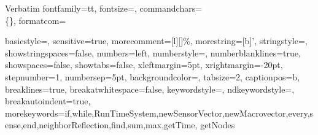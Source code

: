 %
  {Verbatim}%
  {fontfamily=tt,%
   fontsize=\small,%
   commandchars=\\\{\},%
   formatcom=\def\{{\symbol{123}}\def\}{\symbol{125}}\def\\{\symbol{92}}%
   }

\newcommand{\fancyfloatsize}{\small}


\newenvironment{fancyfigure}[1][tbp]%
  {\begin{figure}[#1]%
   \fancyfloatsize%
   \fancyfloatrule%
  }
  {\fancyfloatrule%
   \end{figure}}

\newcommand*{\Month}{%
  \ifcase\month \or
  January\or February\or March\or April\or May\or June\or
  July\or August\or September\or October\or November\or
  December\fi \xspace
}

\newcommand*{\Year}{\number\year\xspace}

\usepackage{calc}

\newenvironment{Ventry}[1]%
 {\begin{list}{}{\renewcommand{\makelabel}[1]{##1:\hfil}%
  \settowidth{\labelwidth}{\textsf{#1:}}%
  \setlength{\itemsep}{0pt}%
  \setlength{\parsep}{0pt}%
  \setlength{\leftmargin}{\labelwidth+\labelsep}}}%
  {\end{list}}

\def\PAIR#1#2{\langle#1, #2\rangle} 
{
  basicstyle=\ttfamily\small,
  sensitive=true,
  morecomment=[l][\color{red}\small]{\%},
  morestring=[b]',
  stringstyle=\color{dkgreen}, %
  showstringspaces=false,   
  numbers=left, %
  numberstyle=\ttfamily\small\color{gray}, %
  numberblanklines=true,
  showspaces=false,
  showtabs=false,
  xleftmargin=5pt,
  xrightmargin=-20pt,
  stepnumber=1,   
  numbersep=5pt,   
  backgroundcolor=\color{white},   
  tabsize=2,
  captionpos=b,   
  breaklines=true,
  breakatwhitespace=false,
  keywordstyle=\color{blue},   
  ndkeywordstyle=\color{red},   
  breakautoindent=true,
  morekeywords={if,while,RunTimeSystem,newSensorVector,newMacrovector,every,sense,end,neighborReflection,find,sum,max,getTime,
  getNodes}
}

